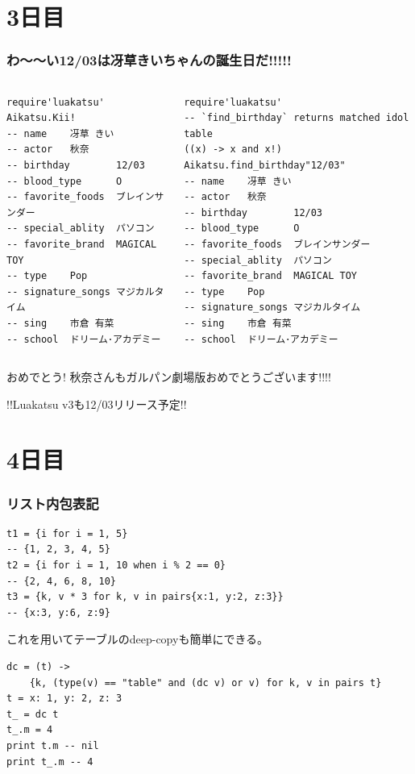 \section{3日目}
\begin{frame}[fragile]
	\frametitle{わ〜〜い12/03は冴草きいちゃんの誕生日だ!!!!!}
	\begin{columns}
	\scriptsize
		\column[b]{.41\hsize}
		\begin{lstlisting}[numbers=none,language=MoonScript]
require'luakatsu'
Aikatsu.Kii!
-- name    冴草 きい
-- actor   秋奈
-- birthday        12/03
-- blood_type      O
-- favorite_foods  ブレインサンダー
-- special_ablity  パソコン
-- favorite_brand  MAGICAL TOY
-- type    Pop
-- signature_songs マジカルタイム
-- sing    市倉 有菜
-- school  ドリーム･アカデミー
		\end{lstlisting}
		\begin{lstlisting}[numbers=none,language=MoonScript,title=\alert{Luakatsu v3 draft function}]
require'luakatsu'
-- `find_birthday` returns matched idol table
((x) -> x and x!) Aikatsu.find_birthday"12/03"
-- name    冴草 きい
-- actor   秋奈
-- birthday        12/03
-- blood_type      O
-- favorite_foods  ブレインサンダー
-- special_ablity  パソコン
-- favorite_brand  MAGICAL TOY
-- type    Pop
-- signature_songs マジカルタイム
-- sing    市倉 有菜
-- school  ドリーム･アカデミー
		\end{lstlisting}
	\end{columns}
おめでとう! 秋奈さんもガルパン劇場版おめでとうございます!!!!

\pause
!!Luakatsu v3も\alert{12/03リリース}予定!!
\end{frame}
\section{4日目}
\begin{frame}[fragile]
	\frametitle{リスト内包表記}
	\bgroup\scriptsize
	\begin{lstlisting}[numbers=none,language=MoonScript]
t1 = {i for i = 1, 5}
-- {1, 2, 3, 4, 5}
t2 = {i for i = 1, 10 when i % 2 == 0}
-- {2, 4, 6, 8, 10}
t3 = {k, v * 3 for k, v in pairs{x:1, y:2, z:3}}
-- {x:3, y:6, z:9}
	\end{lstlisting}
	\egroup

	これを用いてテーブルのdeep-copyも簡単にできる。
	\bgroup\scriptsize
	\begin{lstlisting}[numbers=none,language=MoonScript]
dc = (t) ->
	{k, (type(v) == "table" and (dc v) or v) for k, v in pairs t}
t = x: 1, y: 2, z: 3
t_ = dc t
t_.m = 4
print t.m -- nil
print t_.m -- 4
	\end{lstlisting}
	\egroup

\end{frame}
